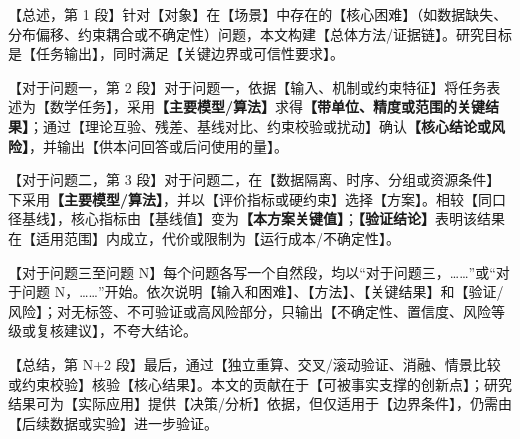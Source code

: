 
【总述，第 1 段】针对【对象】在【场景】中存在的【核心困难】（如数据缺失、分布偏移、约束耦合或不确定性）问题，本文构建【总体方法/证据链】。研究目标是【任务输出】，同时满足【关键边界或可信性要求】。

【对于问题一，第 2 段】对于问题一，依据【输入、机制或约束特征】将任务表述为【数学任务】，采用\textbf{【主要模型/算法】}求得\textbf{【带单位、精度或范围的关键结果】}；通过【理论互验、残差、基线对比、约束校验或扰动】确认\textbf{【核心结论或风险】}，并输出【供本问回答或后问使用的量】。

【对于问题二，第 3 段】对于问题二，在【数据隔离、时序、分组或资源条件】下采用\textbf{【主要模型/算法】}，并以【评价指标或硬约束】选择【方案】。相较【同口径基线】，核心指标由【基线值】变为\textbf{【本方案关键值】}；\textbf{【验证结论】}表明该结果在【适用范围】内成立，代价或限制为【运行成本/不确定性】。

【对于问题三至问题 N】每个问题各写一个自然段，均以“对于问题三，……”或“对于问题 N，……”开始。依次说明【输入和困难】、【方法】、【关键结果】和【验证/风险】；对无标签、不可验证或高风险部分，只输出【不确定性、置信度、风险等级或复核建议】，不夸大结论。

【总结，第 N+2 段】最后，通过【独立重算、交叉/滚动验证、消融、情景比较或约束校验】核验【核心结果】。本文的贡献在于【可被事实支撑的创新点】；研究结果可为【实际应用】提供【决策/分析】依据，但仅适用于【边界条件】，仍需由【后续数据或实验】进一步验证。
